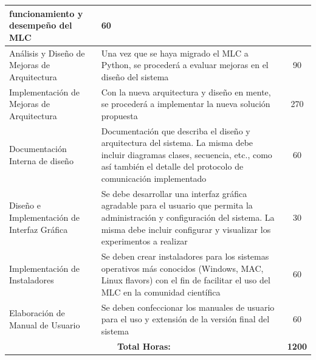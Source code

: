 \documentclass[a4paper,10pt]{article}
\begin{document}
\begin{center}
\begin{longtable}{|p{3.5cm}|p{7cm}|c|}
            funcionamiento y desempeño del MLC & 60 \\
            \hline
            Análisis y Diseño de Mejoras de Arquitectura & Una vez que se haya migrado el MLC a Python, se procederá a evaluar
            mejoras en el diseño del sistema & 90 \\
            \hline
            Implementación de Mejoras de Arquitectura & Con la nueva arquitectura y diseño en mente, se procederá a implementar
            la nueva solución propuesta & 270 \\
            \hline
            Documentación Interna de diseño & Documentación que describa el diseño y arquitectura del sistema. La misma debe incluir
            diagramas clases, secuencia, etc., como así también el detalle del protocolo de comunicación implementado & 60 \\
            \hline
            Diseño e Implementación de Interfaz Gráfica & Se debe desarrollar una interfaz gráfica agradable para el usuario que permita
            la administración y configuración del sistema. La misma debe incluir configurar y visualizar los experimentos a realizar
            & 30 \\
            \hline
            Implementación de Instaladores & Se deben crear instaladores para los sistemas operativos más conocidos
            (Windows, MAC, Linux flavors) con el fin de facilitar el uso del MLC en la comunidad científica & 60 \\
            \hline
            Elaboración de Manual de Usuario & Se deben confeccionar los manuales de usuario para el uso y extensión de la versión final
            del sistema & 60 \\
            \hline
            \multicolumn{2}{|c|}{\textbf{Total Horas:}} & \textbf{1200} \\
            \hline
        \end{longtable}
        \end{center}

    \newpage

    \newpage
    {}
    
\end{document}
